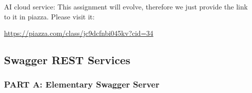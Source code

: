 \begin{exercise}

AI cloud service: This assignment will evolve, therefore we just
provide the link to it in piazza. Please visit it:

\url{https://piazza.com/class/jc9dcfnbi045kv?cid=34}
\end{exercise}

\subsection{Swagger REST Services}

\subsubsection{PART A: Elementary Swagger Server}
 
